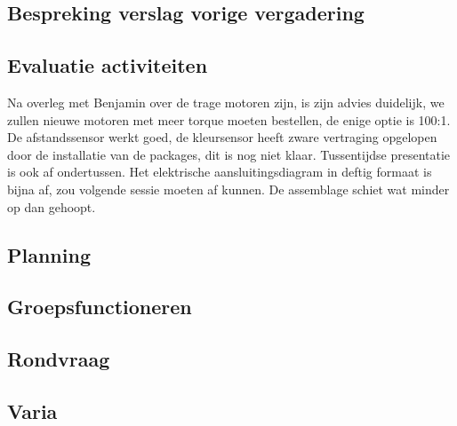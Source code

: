 \documentclass[a4paper,kulak]{kulakarticle} %
\begin{document}
\subsection{Bespreking verslag vorige vergadering}

\subsection{Evaluatie activiteiten}
Na overleg met Benjamin over de trage motoren zijn, is zijn advies duidelijk, we zullen nieuwe motoren met meer torque moeten bestellen, de enige optie is 100:1. De afstandssensor werkt goed, de kleursensor heeft zware vertraging opgelopen door de installatie van de packages, dit is nog niet klaar. Tussentijdse presentatie is ook af ondertussen. Het elektrische aansluitingsdiagram in deftig formaat is bijna af, zou volgende sessie moeten af kunnen. De assemblage schiet wat minder op dan gehoopt. 

\subsection{Planning}

\subsection{Groepsfunctioneren}

\subsection{Rondvraag}

\subsection{Varia}
\end{document}
